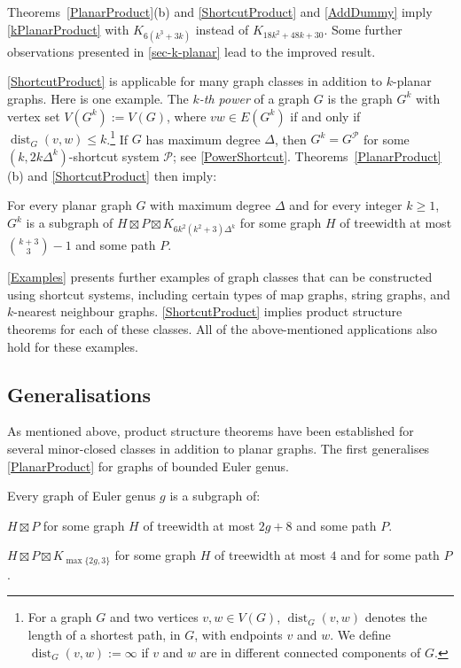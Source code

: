 \documentclass{patmorin}
\DeclareMathOperator{\dist}{dist}
\newcommand{\PP}{\mathcal{P}}
\renewcommand{\geq}{\geqslant}
\renewcommand{\leq}{\leqslant}
\begin{document}
Theorems~\ref{PlanarProduct}(b) and \ref{ShortcutProduct} and \cref{AddDummy} imply \cref{kPlanarProduct} with $K_{6(k^3+3k)}$ instead of $K_{18k^2+48k+30}$. Some further observations presented in \cref{sec-k-planar} lead to the improved result.

\cref{ShortcutProduct} is applicable for many graph classes in addition to $k$-planar graphs. Here is one example. The \emph{$k$-th power} of a graph $G$ is the graph $G^k$ with vertex set $V(G^k):=V(G)$, where $vw\in E(G^k)$ if and only if $\dist_G(v,w)\leq k$.\footnote{For a graph $G$ and two vertices $v,w\in V(G)$, $\dist_G(v,w)$  denotes the length of a shortest path, in $G$, with endpoints $v$ and $w$.  We define $\dist_G(v,w):=\infty$ if $v$ and $w$ are in different connected components of $G$.} If $G$ has maximum degree $\Delta$, then $G^k = G^\PP$ for some $(k,2k\Delta^{k})$-shortcut system $\PP$; see \cref{PowerShortcut}. Theorems~\ref{PlanarProduct}(b) and \ref{ShortcutProduct} then imply:

\begin{thm}
\label{kPowerBasic}
For every planar graph $G$ with maximum degree $\Delta$ and for every integer $k\geq 1$, $G^k$ is a subgraph of $H\boxtimes P\boxtimes K_{6k^2(k^2+3)\Delta^{k}}$ for some graph $H$ of treewidth at most $\binom{k+3}{3}-1$ and some path $P$.
\end{thm}

\cref{Examples} presents further examples of graph classes that can be constructed using shortcut systems, including certain types of map graphs, string graphs, and $k$-nearest neighbour graphs. \cref{ShortcutProduct} implies product structure theorems for each of these classes. All of the above-mentioned applications also hold for these examples. 

\subsection{Generalisations}
\label{Generalisations}

As mentioned above, product structure theorems have been established for several minor-closed classes in addition to planar graphs. The first generalises \cref{PlanarProduct} for graphs of bounded Euler genus. 

\begin{thm}
	\label{GenusProduct}
	Every graph of Euler genus $g$ is a subgraph of:
	\begin{compactenum}[(a)]
		\item $H  \boxtimes P$ for some graph $H$ of treewidth at most $2g+8$  and some path $P$.
		\item $H \boxtimes P \boxtimes K_{\max\{2g,3\}}$ for some graph $H$ of treewidth at most $4$ and for some path $P$.\label{temp}
	\end{compactenum}
\end{thm}
\end{document}
